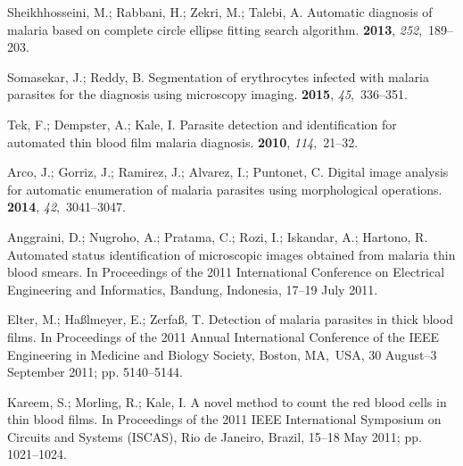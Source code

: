 \documentclass[sensors,review,accept,moreauthors,pdftex,10pt,a4paper]{mdpi}
\begin{document}
\begin{thebibliography}{999}
Sheikhhosseini, M.; Rabbani, H.; Zekri, M.; Talebi, A.
\newblock Automatic diagnosis of malaria based on complete circle ellipse
  fitting search algorithm.
 {\bf 2013}, {\em 252},~189--203.

Somasekar, J.; Reddy, B.
\newblock Segmentation of erythrocytes infected with malaria parasites for the
  diagnosis using microscopy imaging.
 {\bf 2015}, {\em
  45},~336--351.

Tek, F.; Dempster, A.; Kale, I.
\newblock Parasite detection and identification for automated thin blood film
  malaria diagnosis.
 {\bf 2010}, {\em
  114},~21--32.

Arco, J.; Gorriz, J.; Ramirez, J.; Alvarez, I.; Puntonet, C.
\newblock Digital image analysis for automatic enumeration of malaria parasites
  using morphological operations.
 {\bf 2014}, {\em 42},~3041--3047.

Anggraini, D.; Nugroho, A.; Pratama, C.; Rozi, I.; Iskandar, A.; Hartono, R.
\newblock Automated status identification of microscopic images obtained from
  malaria thin blood smears.
\newblock  In Proceedings of the 2011 International Conference on Electrical
  Engineering and Informatics,  Bandung, Indonesia, 17--19 July 2011.

Elter, M.; Ha{\ss}lmeyer, E.; Zerfa{\ss}, T.
\newblock Detection of malaria parasites in thick blood films.
\newblock  In Proceedings of the 2011 Annual International Conference of the
  IEEE Engineering in Medicine and Biology Society, Boston, MA,~USA, 30 August--3 September 2011; pp. 5140--5144.

Kareem, S.; Morling, R.; Kale, I.
\newblock A novel method to count the red blood cells in thin blood films.
\newblock  In Proceedings of the 2011 IEEE International Symposium on Circuits
  and Systems (ISCAS), Rio de Janeiro, Brazil, 15--18 May 2011; pp. 1021--1024.


\end{thebibliography}
\end{document}
